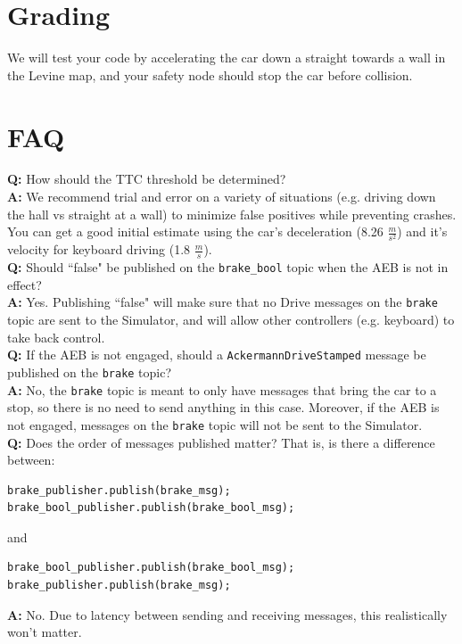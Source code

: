 \documentclass[letter]{article}
\begin{document}
\section {Grading}
We will test your code by accelerating the car down a straight towards a wall in the Levine map, and your safety node should stop the car before collision. 

\section{FAQ}
\textbf{Q:} How should the TTC threshold be determined? \\
\textbf{A:} We recommend trial and error on a variety of situations (e.g. driving down the hall vs straight at a wall) to minimize false positives while preventing crashes. You can get a good initial estimate using the car's deceleration (8.26 $\frac{m}{s^2}$) and it's velocity for keyboard driving (1.8 $\frac{m}{s}$). \\

\textbf{Q:} Should ``false" be published on the \texttt{brake\_bool} topic when the AEB is not in effect? \\
\textbf{A:} Yes. Publishing ``false" will make sure that no Drive messages on the \texttt{brake} topic are sent to the Simulator, and will allow other controllers (e.g. keyboard) to take back control. \\

\textbf{Q:} If the AEB is not engaged, should a \texttt{AckermannDriveStamped} message be published on the \texttt{brake} topic? \\
\textbf{A:} No, the \texttt{brake} topic is meant to only have messages that bring the car to a stop, so there is no need to send anything in this case. Moreover, if the AEB is not engaged, messages on the \texttt{brake} topic will not be sent to the Simulator. \\

\textbf{Q:} Does the order of messages published matter? That is, is there a difference between:
\begin{verbatim}
brake_publisher.publish(brake_msg);
brake_bool_publisher.publish(brake_bool_msg);
\end{verbatim}
and
\begin{verbatim}
brake_bool_publisher.publish(brake_bool_msg);
brake_publisher.publish(brake_msg);
\end{verbatim} 
\textbf{A:} No. Due to latency between sending and receiving messages, this realistically won't matter. \\
\end{document}
